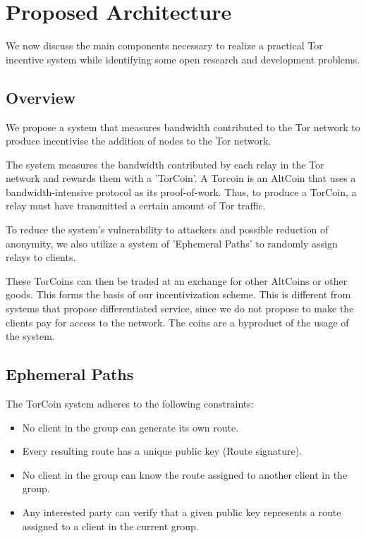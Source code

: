 \section{Proposed Architecture} \label{arch}

We now discuss the main components necessary to realize a practical Tor
incentive system while identifying some open research and development problems.

\subsection{Overview}
We propose a system that measures bandwidth contributed to the Tor network to produce incentivise the addition of nodes to the Tor network.

The system measures the bandwidth contributed by each relay in the Tor network and rewards them with a 'TorCoin'. A Torcoin is an AltCoin that uses a bandwidth-intensive protocol as its proof-of-work. Thus, to produce a TorCoin, a relay must have transmitted a certain amount of Tor traffic.

To reduce the system's vulnerability to attackers and possible reduction of anonymity, we also utilize a system of 'Ephemeral Paths' to randomly assign relays to clients.

These TorCoins can then be traded at an exchange for other AltCoins or other goods. This forms the basis of our incentivization scheme. This is different from systems that propose differentiated service\cite{dovrolis1999case, dovrolis2002proportional}, since we do not propose to make the clients pay for access to the network. The coins are a byproduct of the usage of the system.

\subsection{Ephemeral Paths}
The TorCoin system adheres to the following constraints:
\begin{itemize}
  \item No client in the group can generate its own route.
  \item Every resulting route has a unique public key (Route signature).
  \item No client in the group can know the route assigned to another client in the group.
  \item Any interested party can verify that a given public key represents a route assigned to a client in the current group.
\end{itemize}

